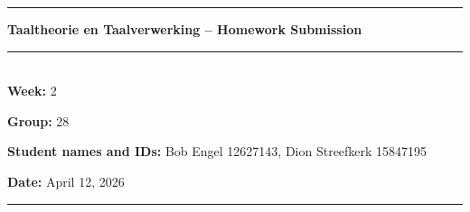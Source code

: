 \documentclass[11pt]{article}
\begin{document}

\rule{\textwidth}{1pt}
\begin{center}
  \textbf{Taaltheorie en Taalverwerking -- Homework Submission}
\end{center}
\rule{\textwidth}{0.5pt}\\


\textbf{Week:} 2

\textbf{Group:} 28

\textbf{Student names and IDs:} Bob Engel 12627143, Dion Streefkerk 15847195

\textbf{Date:} April 12, 2026

\rule{\textwidth}{1pt}

\end{document}
